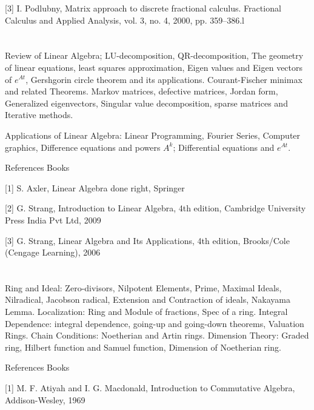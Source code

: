 [3] I. Podlubny, Matrix approach to discrete fractional calculus. Fractional Calculus and Applied Analysis, vol. 3, no. 4, 2000, pp. 359–386.l 

   
\section{\dsccourseinfo}

Review of Linear Algebra; LU-decomposition, QR-decomposition, The geometry of linear equations, least squares approximation, Eigen values and Eigen vectors of $e^{At}$, Gershgorin circle theorem and its applications. Courant-Fischer minimax and related Theorems. Markov matrices, defective matrices, Jordan form, Generalized eigenvectors, Singular value decomposition, sparse matrices and Iterative methods.  

Applications of Linear Algebra: Linear Programming, Fourier Series, Computer graphics, Difference equations and powers $A^k$; Differential equations and $e^{At}$. 

 

References Books  

[1] S. Axler, Linear Algebra done right, Springer 

[2] G. Strang, Introduction to Linear Algebra, 4th edition, Cambridge University Press India Pvt Ltd, 2009 

[3] G.  Strang, Linear Algebra and Its Applications, 4th edition, Brooks/Cole (Cengage Learning), 2006 

 
\section{\dsccourseinfo}
 

Ring and Ideal: Zero-divisors, Nilpotent Elements, Prime, Maximal Ideals, Nilradical, Jacobson radical, Extension and Contraction of ideals, Nakayama Lemma. Localization: Ring and Module of fractions, Spec of a ring. Integral Dependence: integral dependence, going-up and going-down theorems, Valuation Rings. Chain Conditions: Noetherian and Artin rings. Dimension Theory: Graded ring, Hilbert function and Samuel function, Dimension of Noetherian ring.   

 

References Books  

[1] M. F. Atiyah and I. G. Macdonald, Introduction to Commutative Algebra, Addison-Wesley, 1969  


